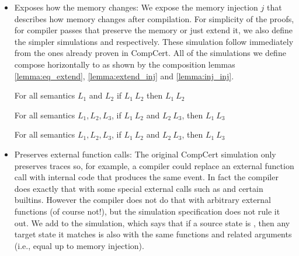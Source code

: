\begin{itemize}
\item Exposes how the memory changes: We expose the memory injection $j$ that describes how memory changes after compilation. For simplicity of the proofs, for compiler passes that preserve the memory or just extend it, we also define the simpler simulations   and  respectively. These simulation follow immediately from the ones already proven in CompCert. All of the simulations we define compose horizontally to  as shown by the composition lemmas \autoref{lemma:eq_extend}, \autoref{lemma:extend_inj} and \autoref{lemma:inj_inj}.

\begin{lemma}\label{lemma:eq_extend}
For all semantics $L_1$ and $L_2$ if  $L_1 \ L_2$ then  $L_1 \ L_2$\end{lemma} 
\begin{lemma}\label{lemma:extend_inj}
For all semantics $L_1, L_2, L_3$, if  $L_1 \ L_2$ and  $L_2 \ L_3$, then  $L_1 \ L_3$
\end{lemma} 
\begin{lemma}\label{lemma:inj_inj}
For all semantics $L_1, L_2, L_3$, if  $L_1 \ L_2$ and  $L_2 \ L_3$, then  $L_1 \ L_3$
\end{lemma} 


\item Preserves external function calls: The original CompCert simulation only preserves traces so, for example, a compiler could replace an external function call with internal code that produces the same event. In fact the compiler does exactly that with some special external calls such as  and certain builtins. However the compiler does not do that with arbitrary external functions (of course not!), but the simulation specification does not rule it out.  We add  to the simulation, which says that if a source state is , then any target state it matches is also  with the same functions and related arguments (i.e., equal up to memory injection).  


\end{itemize}
